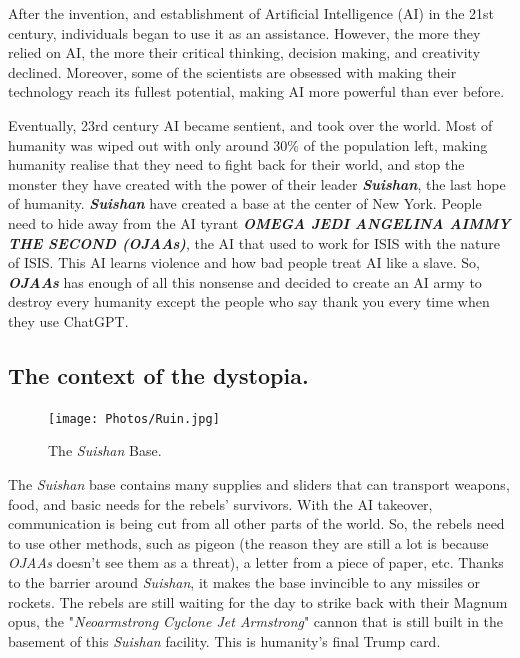 \documentclass[11pt]{book}
\begin{document}
				After the invention, and establishment of Artificial Intelligence (AI) in the 21st century, individuals began to use it as an assistance. However, the more they relied on AI, the more their critical thinking, decision making, and creativity declined. Moreover, some of the scientists are obsessed with making their technology reach its fullest potential, making AI more powerful than ever before.
				
				Eventually,  23rd century AI became sentient, and took over the world. Most of humanity was wiped out with only around 30\% of the population left, making humanity realise that they need to fight back for their world, and stop the monster they have created with the power of their leader \textbf{\textit{Suishan}}, the last hope of humanity. \textbf{\textit{Suishan}} have created a base at the center of New York. People need to hide away from the AI tyrant \textbf{\textit{OMEGA JEDI ANGELINA AIMMY THE SECOND (OJAAs)}}, the AI that used to work for ISIS with the nature of ISIS. This AI learns violence and how bad people treat AI like a slave. So, \textbf{\textit{OJAAs}} has enough of all this nonsense and decided to create an AI army to destroy every humanity except the people who say thank you every time when they use ChatGPT. 	
				
				
			\subsection{The context of the dystopia.}
				\begin{figure}[H]
							\begin{center}
  							\texttt{[image: Photos/Ruin.jpg]}
  							\end{center}
 							\caption{The \textit{Suishan} Base.}
				\end{figure}
				The \textit{Suishan} base contains many supplies and sliders that can transport weapons, food, and basic needs for the rebels’ survivors. With the AI takeover, communication is being cut from all other parts of the world. So, the rebels need to use other methods, such as pigeon (the reason they are still a lot is because \textit{OJAAs} doesn’t see them as a threat), a letter from a piece of paper, etc. Thanks to the barrier around \textit{Suishan}, it makes the base invincible to any missiles or rockets. The rebels are still waiting for the day to strike back with their Magnum opus, the "\textit{Neoarmstrong Cyclone Jet Armstrong}" cannon that is still built in the basement of this \textit{Suishan} facility. This is humanity's final Trump card.
				
\end{document}
